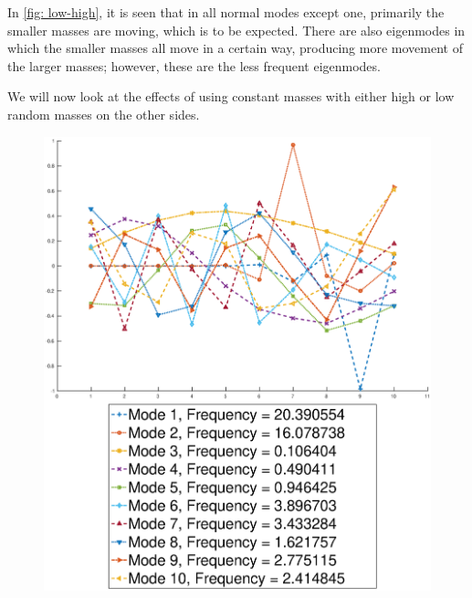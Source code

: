 \documentclass[10pt,a4paper]{article}
\begin{document}
\begin{multicols*}{2}
In \cref{fig: low-high}, it is seen that in all normal modes except one, primarily the smaller masses are moving, which is to be expected. There are also eigenmodes in which the smaller masses all move in a certain way, producing more movement of the larger masses; however, these are the less frequent eigenmodes.

We will now look at the effects of using constant masses with either high or low random masses on the other sides. 

\begin{figure}[H]
	\includegraphics[width=\columnwidth]{figures/low-lowrand.eps}

\end{figure}
\end{multicols*}
\end{document}
